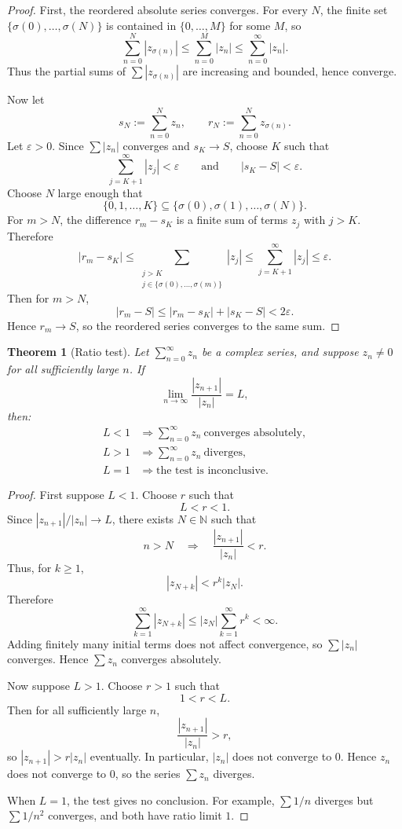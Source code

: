 \documentclass[11pt]{article}
\newtheorem{theorem}{Theorem}[section]
\newcommand{\N}{\mathbb{N}}
\newcommand{\abs}[1]{\left|#1\right|}
\begin{document}
\begin{proof}
First, the reordered absolute series converges.
For every $N$, the finite set $\{\sigma(0),\dots,\sigma(N)\}$ is contained in $\{0,\dots,M\}$ for some $M$, so
\[
  \sum_{n=0}^{N}\abs{z_{\sigma(n)}}
  \le \sum_{n=0}^{M}\abs{z_{n}}
  \le \sum_{n=0}^{\infty}\abs{z_{n}}.
\]
Thus the partial sums of $\sum\abs{z_{\sigma(n)}}$ are increasing and bounded, hence converge.

Now let
\[
  s_{N}:=\sum_{n=0}^{N}z_{n},
  \qquad
  r_{N}:=\sum_{n=0}^{N}z_{\sigma(n)}.
\]
Let $\varepsilon>0$.
Since $\sum\abs{z_{n}}$ converges and $s_{K}\to S$, choose $K$ such that
\[
  \sum_{j=K+1}^{\infty}\abs{z_{j}}<\varepsilon
  \qquad\text{and}\qquad
  \abs{s_{K}-S}<\varepsilon.
\]
Choose $N$ large enough that
\[
  \{0,1,\dots,K\}\subseteq \{\sigma(0),\sigma(1),\dots,\sigma(N)\}.
\]
For $m>N$, the difference $r_{m}-s_{K}$ is a finite sum of terms $z_{j}$ with $j>K$.
Therefore
\[
  \abs{r_{m}-s_{K}}
  \le \sum_{\substack{j>K\\ j\in\{\sigma(0),\dots,\sigma(m)\}}}\abs{z_{j}}
  \le \sum_{j=K+1}^{\infty}\abs{z_{j}}
  \le \varepsilon.
\]
Then for $m>N$,
\[
  \abs{r_{m}-S}
  \le \abs{r_{m}-s_{K}}+\abs{s_{K}-S}
  <2\varepsilon.
\]
Hence $r_{m}\to S$, so the reordered series converges to the same sum.
\end{proof}

\begin{theorem}[Ratio test]
Let $\sum_{n=0}^{\infty}z_{n}$ be a complex series, and suppose $z_{n}\ne0$ for all sufficiently large $n$.
If
\[
  \lim_{n\to\infty}\frac{\abs{z_{n+1}}}{\abs{z_{n}}}=L,
\]
then:
\[
\begin{array}{ll}
  L<1 & \Longrightarrow \sum_{n=0}^{\infty}z_{n}\ \text{converges absolutely},\\[4pt]
  L>1 & \Longrightarrow \sum_{n=0}^{\infty}z_{n}\ \text{diverges},\\[4pt]
  L=1 & \Longrightarrow \text{the test is inconclusive}.
\end{array}
\]
\end{theorem}

\begin{proof}
First suppose $L<1$.
Choose $r$ such that
\[
  L<r<1.
\]
Since $\abs{z_{n+1}}/\abs{z_{n}}\to L$, there exists $N\in\N$ such that
\[
  n>N
  \quad\Longrightarrow\quad
  \frac{\abs{z_{n+1}}}{\abs{z_{n}}}<r.
\]
Thus, for $k\ge1$,
\[
  \abs{z_{N+k}}
  < r^{k}\abs{z_{N}}.
\]
Therefore
\[
  \sum_{k=1}^{\infty}\abs{z_{N+k}}
  \le \abs{z_{N}}\sum_{k=1}^{\infty}r^{k}<\infty.
\]
Adding finitely many initial terms does not affect convergence, so $\sum\abs{z_{n}}$ converges.
Hence $\sum z_{n}$ converges absolutely.

Now suppose $L>1$.
Choose $r>1$ such that
\[
  1<r<L.
\]
Then for all sufficiently large $n$,
\[
  \frac{\abs{z_{n+1}}}{\abs{z_{n}}}>r,
\]
so $\abs{z_{n+1}}>r\abs{z_{n}}$ eventually.
In particular, $\abs{z_{n}}$ does not converge to $0$.
Hence $z_{n}$ does not converge to $0$, so the series $\sum z_{n}$ diverges.

When $L=1$, the test gives no conclusion.
For example, $\sum 1/n$ diverges but $\sum 1/n^{2}$ converges, and both have ratio limit $1$.
\end{proof}
\end{document}
